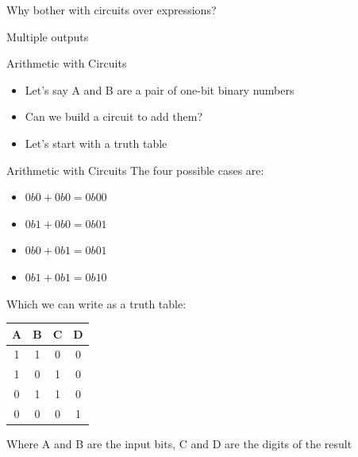 
\begin{frame}{Why bother with circuits over expressions?}

	Multiple outputs

\end{frame}


\begin{frame}{Arithmetic with Circuits}
	\begin{itemize}
		\item Let's say A and B are a pair of one-bit binary numbers
		\item Can we build a circuit to add them?
		\item Let's start with a truth table
	\end{itemize}
\end{frame}


\begin{frame}{Arithmetic with Circuits}
	The four possible cases are:
	\begin{itemize}
		\item $0b0 + 0b0 = 0b00$
		\item $0b1 + 0b0 = 0b01$
		\item $0b0 + 0b1 = 0b01$
		\item $0b1 + 0b1 = 0b10$
	\end{itemize}

	Which we can write as a truth table:
	\begin{center}
		\begin{tabular}{c c c c}
			A & B & C & D \\
			\hline
			1 & 1 & 0 & 0 \\
			1 & 0 & 1 & 0 \\
			0 & 1 & 1 & 0 \\
			0 & 0 & 0 & 1
		\end{tabular}
	\end{center}

	Where A and B are the input bits, C and D are the digits of the result
\end{frame}



